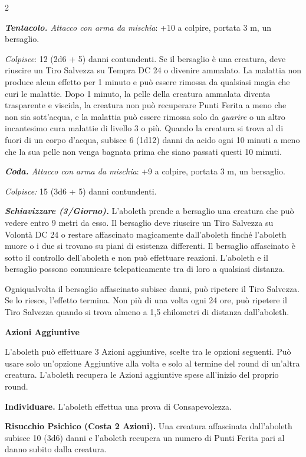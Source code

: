 \begin{multicols}{2}
{\emph{\textbf{Tentacolo.} Attacco con arma da mischia}: +10 a colpire, portata 3 m, un bersaglio.

\emph{Colpisce}: 12 (2d6 + 5) danni contundenti. Se il bersaglio è una creatura, deve riuscire un Tiro Salvezza su Tempra DC 24 o divenire ammalato. La malattia non produce alcun effetto per 1 minuto e può essere rimossa da qualsiasi magia che curi le malattie. Dopo 1 minuto, la pelle della creatura ammalata diventa trasparente e viscida, la creatura non può recuperare Punti Ferita a meno che non sia sott'acqua, e la malattia può essere rimossa solo da \emph{guarire} o un altro incantesimo cura malattie di livello 3 o più. Quando la creatura si trova al di fuori di un corpo d'acqua, subisce 6 (1d12) danni da acido ogni 10 minuti a meno che la sua pelle non venga bagnata prima che siano passati questi 10 minuti.

\emph{\textbf{Coda.} Attacco con arma da mischia}: +9 a colpire, portata 3 m, un bersaglio.

\emph{Colpisce:} 15 (3d6 + 5) danni contundenti.

\emph{\textbf{Schiavizzare (3/Giorno).}} L'aboleth prende a bersaglio una creatura che può vedere entro 9 metri da esso. Il bersaglio deve riuscire un Tiro Salvezza su Volontà DC 24 o restare affascinato magicamente dall'aboleth finché l'aboleth muore o i due si trovano su piani di esistenza differenti. Il bersaglio affascinato è sotto il controllo dell'aboleth e non può effettuare reazioni. L'aboleth e il bersaglio possono comunicare telepaticamente tra di loro a qualsiasi distanza.

Ogniqualvolta il bersaglio affascinato subisce danni, può ripetere il Tiro Salvezza. Se lo riesce, l'effetto termina. Non più di una volta ogni 24 ore, può ripetere il Tiro Salvezza quando si trova almeno a 1,5 chilometri di distanza dall'aboleth.

\textbf{Azioni Aggiuntive}

L'aboleth può effettuare 3 Azioni aggiuntive, scelte tra le opzioni seguenti. Può usare solo un'opzione Aggiuntive alla volta e solo al termine del round di un'altra creatura. L'aboleth recupera le Azioni aggiuntive spese all'inizio del proprio round.

\textbf{Individuare.} L'aboleth effettua una prova di Consapevolezza.

\textbf{Risucchio Psichico (Costa 2 Azioni).} Una creatura affascinata dall'aboleth subisce 10 (3d6) danni e l'aboleth recupera un numero di Punti Ferita pari al danno subito dalla creatura.

}
\end{multicols}
